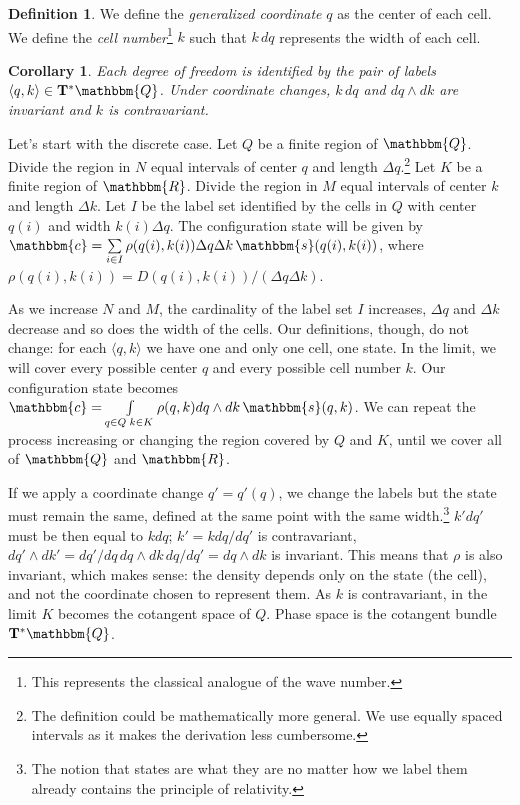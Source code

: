 \documentclass[aps,pra,10pt,twocolumn,floatfix,nofootinbib]{revtex4-1}
\newtheorem{cor}[thm]{Corollary}
\theoremstyle{definition}
\newtheorem{defn}[thm]{Definition}
\begin{document}
\begin{defn}\label{sdof}
We define the \emph{generalized coordinate} $q$ as the center of each cell. We define the \emph{cell number}\footnote{This represents the classical analogue of the wave number.} $k$ such that $k \, dq$ represents the width of each cell.
\end{defn}

\begin{cor}\label{continuousLabels}
Each degree of freedom is identified by the pair of labels $\langle q,k \rangle \in \mathbf{T}^*\mathbbm{Q}$. Under coordinate changes, $k\,dq$ and $dq\wedge dk$ are invariant and $k$ is contravariant.
\end{cor}

Let's start with the discrete case. Let $Q$ be a finite region of $\mathbbm{Q}$. Divide the region in $N$ equal intervals of center $q$ and length $\Delta q$.\footnote{The definition could be mathematically more general. We use equally spaced intervals as it makes the derivation less cumbersome.} Let $K$ be a finite region of $\mathbbm{R}$. Divide the region in $M$ equal intervals of center $k$ and length $\Delta k$. Let $I$ be the label set identified by the cells in $Q$ with center $q(i)$ and width $k(i) \Delta q$. The configuration state will be given by $\mathbbm{c}=\sum\limits_{i \in I} \rho(q(i), k(i)) \Delta q \Delta k \, \mathbbm{s}(q(i), k(i))$, where $\rho(q(i), k(i)) = D(q(i), k(i)) / (\Delta q \Delta k)$.

As we increase $N$ and $M$, the cardinality of the label set $I$ increases, $\Delta q$ and $\Delta k$ decrease and so does the width of the cells. Our definitions, though, do not change: for each $\langle q,k \rangle$ we have one and only one cell, one state. In the limit, we will cover every possible center $q$ and every possible cell number $k$. Our configuration state becomes $\mathbbm{c}=\int\limits_{q \in Q \; k\in K} \rho(q, k) dq \wedge dk \, \mathbbm{s}(q, k)$. We can repeat the process increasing or changing the region covered by $Q$ and $K$, until we cover all of $\mathbbm{Q}$ and $\mathbbm{R}$.

If we apply a coordinate change $q'=q'(q)$, we change the labels but the state must remain the same, defined at the same point with the same width.\footnote{The notion that states are what they are no matter how we label them already contains the principle of relativity.} $k' dq'$ must be then equal to $k dq$; $k'= k dq / dq'$ is contravariant, $dq' \wedge dk'= dq'/dq \, dq \wedge dk \, dq/dq' = dq \wedge dk$ is invariant. This means that $\rho$ is also invariant, which makes sense: the density depends only on the state (the cell), and not the coordinate chosen to represent them. As $k$ is contravariant, in the limit $K$ becomes the cotangent space of $Q$. Phase space is the cotangent bundle $\mathbf{T}^*\mathbbm{Q}$.
\end{document}
